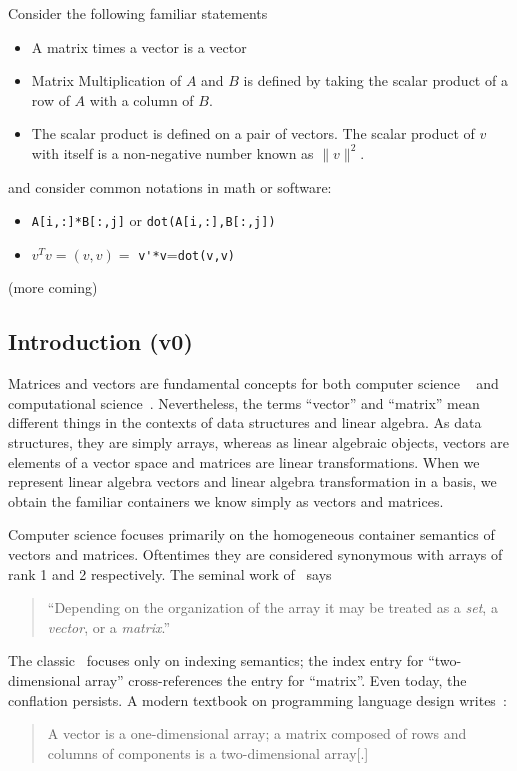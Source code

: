 Consider the following familiar  statements  \begin{itemize}
\item A matrix times a vector is a vector
\item Matrix Multiplication of $A$ and $B$ is defined by taking the scalar product
of a row of $A$ with a column of $B$.
\item  The scalar product is defined on a pair of vectors.
The scalar product of  $v$ with itself is a non-negative number known as
$\|v\|^2$.
\end{itemize}

and consider common  notations in math or software:
\begin{itemize}
\item  \verb+A[i,:]*B[:,j]+ or \verb+dot(A[i,:],B[:,j]) +
\item   $v^T\!v=(v,v)=$ \verb+v'*v+=\verb+dot(v,v)+
\end{itemize}

(more coming)



\subsection{Introduction (v0)}

Matrices and vectors are fundamental concepts for both computer science
~\cite{Knuth1967,Pratt2001} and computational
science~\cite{Strang2003,Trefethen1997}. Nevertheless, the terms ``vector'' and
``matrix'' mean different things in the contexts of data structures and linear
algebra. As data structures, they are simply arrays, whereas as linear
algebraic objects, vectors are elements of a vector space and matrices are linear transformations.
When we represent linear algebra vectors and linear algebra transformation in a basis,
we obtain the familiar containers we know simply as vectors and matrices.



Computer science focuses primarily on the homogeneous container semantics of
vectors and matrices. Oftentimes they are considered synonymous with arrays of
rank 1 and 2 respectively. The seminal work of~\cite{Iliffe1961} says
%
\begin{quote}
``Depending on the organization of the array it may
be treated as a \textit{set}, a \textit{vector}, or a \textit{matrix}.''
\end{quote}
%
The classic~\cite{Knuth1967} focuses only on indexing semantics; the index
entry for ``two-dimensional array'' cross-references the entry for ``matrix''.
Even today, the conflation persists. A modern textbook on programming language
design writes~\cite[p. 215]{Pratt2001}:
%
\begin{quote}
A vector is a one-dimensional array; a matrix composed of rows and columns of
components is a two-dimensional array[.]
\end{quote}

